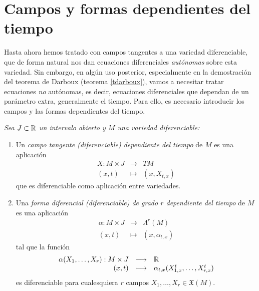 \section{Campos y formas dependientes del tiempo} \label{sec:tiempo}
Hasta ahora hemos tratado con campos tangentes a una variedad diferenciable, que de forma natural nos dan ecuaciones diferenciales \emph{autónomas} sobre esta variedad. Sin embargo, en algún uso posterior, especialmente en la demostración del teorema de Darboux (teorema \ref{tdarboux}), vamos a necesitar tratar ecuaciones \emph{no} autónomas, es decir, ecuaciones diferenciales que dependan de un parámetro extra, generalmente el tiempo. Para ello, es necesario introducir los campos y las formas dependientes del tiempo.

  \begin{defn} \leavevmode
    \em 
    Sea $ J\subset \mathbb{R} $ un intervalo abierto y $ M $ una variedad diferenciable:
    \begin{enumerate}
      \item Un \emph{campo tangente (diferenciable) dependiente del tiempo} de $M$ es una aplicación \[\begin{array}{rcl}X:M\times J & \longrightarrow & TM \\ (x,t) & \longmapsto & (x,X_{t,x}) \end{array} \] que es diferenciable como aplicación entre variedades. 
      \item Una \emph{forma diferencial (diferenciable) de grado $r$ dependiente del tiempo} de $M$ es una aplicación \[\begin{array}{rcl} \alpha: M \times J & \longrightarrow & \varLambda^r(M) \\ (x,t) &  \longmapsto & (x,\alpha_{t,x}) \end{array}\] tal que la función \[\begin{array}{rcl} \alpha(X_1,\dots,X_r):M\times J & \longrightarrow & \mathbb{R} \\ (x,t) & \longmapsto & \alpha_{t,x}(X_{1,x}^t,\dots,X_{r,x}^t)\end{array}\] es diferenciable para cualesquiera $r$ campos $X_1,\dots,X_r \in \mathfrak{X}(M)$.
    \end{enumerate}
  \end{defn}

